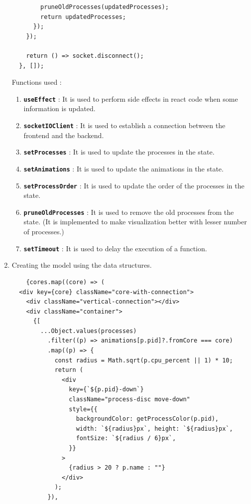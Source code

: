 \documentclass[12pt]{article}
\begin{document}
\begin{enumerate}
\begin{verbatim}
        pruneOldProcesses(updatedProcesses);
        return updatedProcesses;
      });
    });

    return () => socket.disconnect();
  }, []);
\end{verbatim}
Functions used :
\begin{enumerate}
    \item \textbf{\texttt{useEffect}} : It is used to perform side effects in react code when some information is updated.
    \item \textbf{\texttt{socketIOClient}} : It is used to establish a connection between the frontend and the backend.
    \item \textbf{\texttt{setProcesses}} : It is used to update the processes in the state.
    \item \textbf{\texttt{setAnimations}} : It is used to update the animations in the state.
    \item \textbf{\texttt{setProcessOrder}} : It is used to update the order of the processes in the state.
    \item \textbf{\texttt{pruneOldProcesses}} : It is used to remove the old processes from the state. (It is implemented to make visualization better with lesser number of processes.)
    \item \textbf{\texttt{setTimeout}} : It is used to delay the execution of a function.
\end{enumerate}
\item Creating the model using the data structures.
\begin{verbatim}
    {cores.map((core) => (
  <div key={core} className="core-with-connection">
    <div className="vertical-connection"></div>
    <div className="container">
      {[
        ...Object.values(processes)
          .filter((p) => animations[p.pid]?.fromCore === core)
          .map((p) => {
            const radius = Math.sqrt(p.cpu_percent || 1) * 10;
            return (
              <div
                key={`${p.pid}-down`}
                className="process-disc move-down"
                style={{
                  backgroundColor: getProcessColor(p.pid), 
                  width: `${radius}px`, height: `${radius}px`,
                  fontSize: `${radius / 6}px`,
                }}
              >
                {radius > 20 ? p.name : ""}
              </div>
            );
          }),


\end{verbatim}
\end{enumerate}
\end{document}
